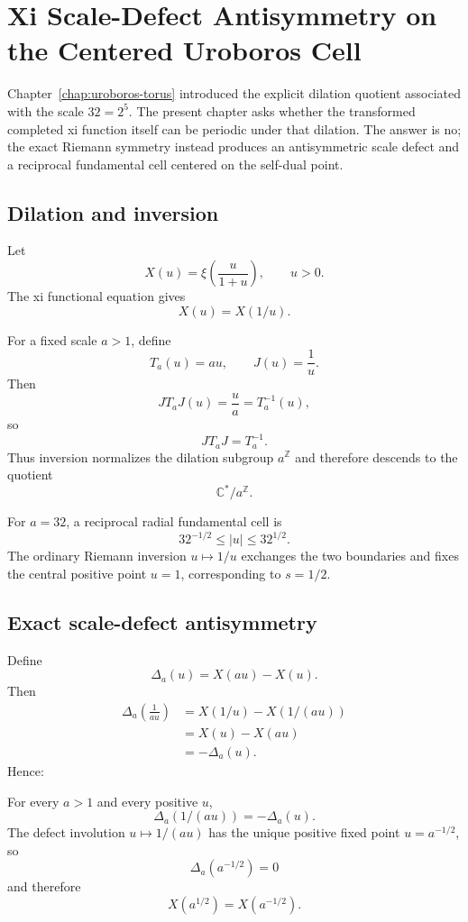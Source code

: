 \chapter{Xi Scale-Defect Antisymmetry on the Centered Uroboros Cell}
\label{chap:xi-scale-defect}


Chapter~\ref{chap:uroboros-torus} introduced the explicit dilation quotient associated with the scale \(32=2^5\).  The present chapter asks whether the transformed completed xi function itself can be periodic under that dilation.  The answer is no; the exact Riemann symmetry instead produces an antisymmetric scale defect and a reciprocal fundamental cell centered on the self-dual point.

\section{Dilation and inversion}

Let
\[
X(u)=\xi\!\left(\frac{u}{1+u}\right),\qquad u>0.
\]
The xi functional equation gives
\[
\boxed{X(u)=X(1/u).}
\]

For a fixed scale \(a>1\), define
\[
T_a(u)=au,\qquad J(u)=\frac1u.
\]
Then
\[
JT_aJ(u)=\frac{u}{a}=T_a^{-1}(u),
\]
so
\[
\boxed{JT_aJ=T_a^{-1}.}
\]
Thus inversion normalizes the dilation subgroup \(a^{\mathbb Z}\) and therefore descends to the quotient
\[
\mathbb C^*/a^{\mathbb Z}.
\]

For \(a=32\), a reciprocal radial fundamental cell is
\[
\boxed{32^{-1/2}\le |u|\le32^{1/2}.}
\]
The ordinary Riemann inversion \(u\mapsto1/u\) exchanges the two boundaries and fixes the central positive point \(u=1\), corresponding to \(s=1/2\).

\section{Exact scale-defect antisymmetry}

Define
\[
\Delta_a(u)=X(au)-X(u).
\]
Then
\[
\begin{aligned}
\Delta_a\!\left(\frac1{au}\right)
&=X(1/u)-X(1/(au))\\
&=X(u)-X(au)\\
&=-\Delta_a(u).
\end{aligned}
\]
Hence:

\begin{theorem}
For every \(a>1\) and every positive \(u\),
\[
\boxed{\Delta_a(1/(au))=-\Delta_a(u).}
\]
The defect involution \(u\mapsto1/(au)\) has the unique positive fixed point \(u=a^{-1/2}\), so
\[
\boxed{\Delta_a(a^{-1/2})=0}
\]
and therefore
\[
\boxed{X(a^{1/2})=X(a^{-1/2}).}
\]
\end{theorem}

